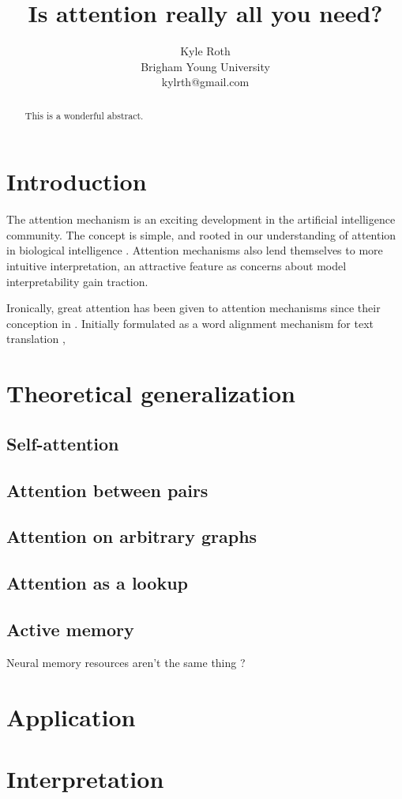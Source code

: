 \documentclass{article}
\title{Is attention really all you need?}
\author{
Kyle Roth\\
\affiliations
Brigham Young University\\
\emails
kylrth@gmail.com
}
\begin{document}
\maketitle

\tableofcontents

\vspace{30px}

\begin{abstract}
This is a wonderful abstract.
\end{abstract}

\section{Introduction}

The attention mechanism is an exciting development in the artificial intelligence community. The concept is simple, and rooted in our understanding of attention in biological intelligence \cite{glimpses,neuroscience-inspired}. Attention mechanisms also lend themselves to more intuitive interpretation, an attractive feature as concerns about model interpretability gain traction.

Ironically, great attention has been given to attention mechanisms since their conception in \citeyear{joint_align_translate}. Initially formulated as a word alignment mechanism for text translation \cite{joint_align_translate},

\section{Theoretical generalization}

\subsection{Self-attention}

\subsection{Attention between pairs}

\subsection{Attention on arbitrary graphs}

\subsection{Attention as a lookup}

\subsection{Active memory}

Neural memory resources aren't the same thing \cite{neural_turing}?

\section{Application}

\section{Interpretation}



\end{document}
